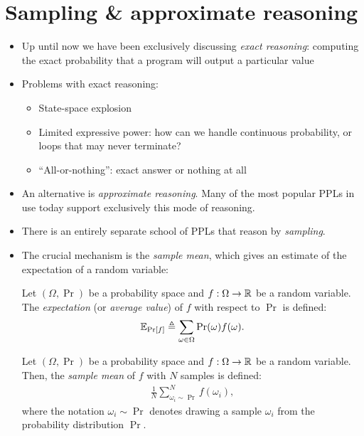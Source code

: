 \documentclass{tufte-handout}
\begin{document}
\section{Sampling \& approximate reasoning}
\begin{itemize}
  \item Up until now we have been exclusively discussing \emph{exact reasoning}:
  computing the exact probability that a program will output a particular value

  \item Problems with exact reasoning:
  \begin{itemize}
    \item State-space explosion
    \item Limited expressive power: how can we handle continuous probability, or loops that may never terminate?
    \item ``All-or-nothing'': exact answer or nothing at all
  \end{itemize}

  \item An alternative is \emph{approximate reasoning}. Many of the most popular PPLs in use 
  today support exclusively this mode of reasoning.

  \item There is an entirely separate school of PPLs that reason by \emph{sampling}.

  \item The crucial mechanism is the \emph{sample mean}, which gives an estimate of the expectation 
  of a random variable:
  
  \begin{definition}[Expectation]
    Let $(\Omega, \Pr)$ be a probability space and $f : \Omega \rightarrow
    \mathbb{R}$ be a random variable. The \emph{expectation} (or \emph{average value}) of $f$ with respect to 
    $\Pr$ is defined:
    \begin{align}
      \mathbb{E}_{\Pr[f]} \triangleq \sum_{\omega \in \Omega} \Pr(\omega) f(\omega).
    \end{align}
  \end{definition}

  \begin{definition}
    Let $(\Omega, \Pr)$ be a probability space and $f : \Omega \rightarrow
    \mathbb{R}$ be a random variable. Then, the \emph{sample mean} of $f$ 
    with $N$ samples is defined:
    \begin{align}
      \frac{1}{N} \sum_{\omega_i \sim \Pr}^N f(\omega_i),
    \end{align}
    where the notation $\omega_i \sim \Pr$ denotes drawing a sample $\omega_i$ from 
    the probability distribution $\Pr$.
  \end{definition}


\end{itemize}
\end{document}
